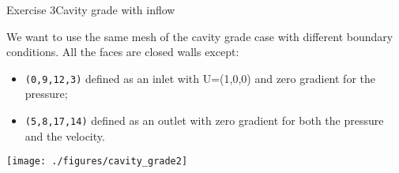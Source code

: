 \documentclass{beamer}
\begin{document}
\begin{frame}{Exercise 3}{Cavity grade with inflow}

We want to use the same mesh of the cavity grade case with different boundary conditions. All the faces are closed walls except:
\begin{itemize}
\item \texttt{(0,9,12,3)} defined as an inlet with U=(1,0,0) and zero gradient for the pressure;
\item \texttt{(5,8,17,14)} defined as an outlet with zero gradient for both the pressure and the velocity.
\end{itemize}

\begin{center}\texttt{[image: ./figures/cavity\_grade2]}\end{center}


\end{frame}
\end{document}
